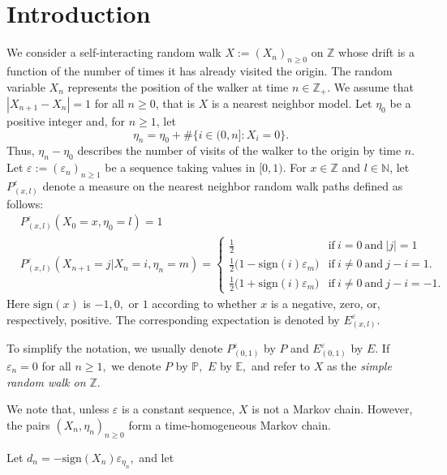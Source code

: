 \documentclass[12pt]{amsart}
\begin{document}
\section{Introduction}
\label{intro} We consider a self-interacting random walk
$X:=(X_n)_{n\ge 0}$ on ${{\mathbb Z}}$ whose drift is a function of the number
of times it has already visited the origin. The random variable
$X_n$ represents the position of the walker at time $n\in{{\mathbb Z}}_+.$ We
assume that $|X_{n+1}-X_n|=1$ for all $n\ge 0$, that is $X$ is a
nearest neighbor model. Let $\eta_0$ be a positive integer and, for
$n\ge 1$, let
\begin{equation}
\label{etan}
\eta_n=\eta_0+\#\{i\in(0,n]:X_i=0\}.
\end{equation}
Thus, $\eta_n -\eta_0$ describes the number of visits of the walker to the origin by time $n$.
Let ${\varepsilon} := ({\varepsilon}_n)_{n \geq1}$ be a  sequence taking values in $[0,1)$.
For $x\in {{\mathbb Z}}$ and $l\in {{\mathbb N}}$, let  $P_{(x,l)}^{\varepsilon}$ denote
a measure on the nearest neighbor random walk paths defined as follows:
\begin{align}
\nonumber
&P_{(x,l)}^{\varepsilon}(X_0=x,\eta_0=l)=1
\\
\label{eq:din}
&P_{(x,l)}^{\varepsilon}(X_{n+1}=j|X_n = i, \eta_n=m) =
\left\{
\begin{array}{ll}
\frac 12&\mbox{if}~i=0~\mbox{and}~|j|=1
\\
\frac12 \bigl(1-\mbox{sign}(i){\varepsilon}_m\bigr)&\mbox{if}~i\ne 0~\mbox{and}~j-i=1.
\\
\frac12 \bigl(1+\mbox{sign}(i){\varepsilon}_m\bigr)&\mbox{if}~i\ne 0~\mbox{and}~j-i=-1.
\end{array}
\right.
\end{align}
Here $\mbox{sign}(x)$ is $-1,0,$ or $1$ according to whether $x$ is
a negative, zero, or, respectively, positive. The corresponding
expectation is denoted by $E_{(x,l)}^{\varepsilon}.$
\par
To simplify the notation, we usually denote $P_{(0,1)}^{\varepsilon}$ by
$P$ and $E_{(0,1)}^{\varepsilon}$ by $E.$ If ${\varepsilon}_n=0$ for all $n\geq 1,$ we
denote $P$ by ${{\mathbb P}},$ $E$ by ${{\mathbb E}},$ and refer to $X$ as the {\em
simple random walk on ${{\mathbb Z}}.$}
\par
We note that, unless ${\varepsilon}$ is a constant sequence, $X$ is not a Markov chain.
However, the pairs $(X_n,\eta_n)_{n\ge 0}$ form a time-homogeneous Markov chain.
\par
Let $d_n=-\mbox{sign}(X_n){\varepsilon}_{\eta_n},$ and let
\end{document}
